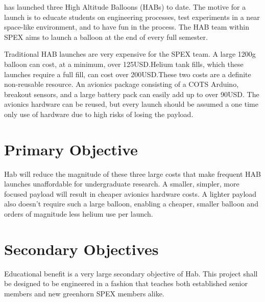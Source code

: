 \documentclass[conference]{IEEEtran} %
\begin{document}
 has launched three High Altitude Balloons (HABs) to date.  The
motive for a launch is to educate students on engineering processes, test experiments in
a near space-like environment, and to have fun in the process. The HAB team within SPEX aims to
launch a balloon at the end of every full semester.

Traditional HAB launches are very expensive for the SPEX team.
A large 1200g balloon can cost, at a minimum, over 125USD.\@  Helium tank fills,
which these launches require a full fill, can cost over 200USD.\@ These two costs
are a definite non-reusable resource. An avionics package consisting of a COTS
Arduino, breakout sensors, and a large battery pack can easily add up to over
90USD. The avionics hardware can be reused, but every launch should be assumed a
one time only use of hardware due to high risks of losing the payload.


\section{Primary Objective}
\label{sec:primary-obj}
\textmu{}Hab will reduce the magnitude of these three large costs that make frequent HAB
launches unaffordable for undergraduate research. A smaller, simpler, more
focused payload will result in cheaper avionics hardware costs. A lighter
payload also doesn't require such a large balloon, enabling a cheaper, smaller
balloon and orders of magnitude less helium use per launch.

\section{Secondary Objectives}
\label{sec:secondary-obj}
Educational benefit is a very large secondary objective of \textmu{}Hab.  This
project shall be designed to be engineered in a fashion that teaches both
established senior members and new greenhorn SPEX members alike.
\end{document}
